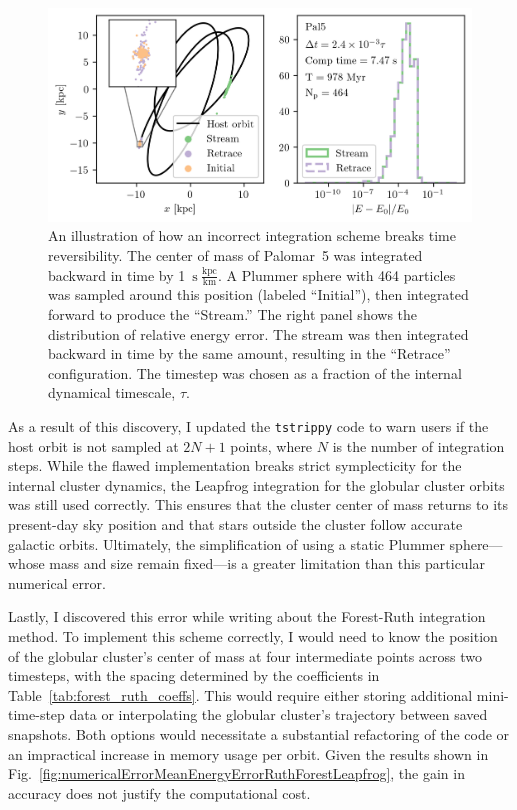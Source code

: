         \begin{figure}
            \centering
            \includegraphics[width=\linewidth]{images/NumericalErrorStreamRetrace_Pal5_Nsteps_32768_stepsPerTau_420.png}
            \caption{An illustration of how an incorrect integration scheme breaks time reversibility. The center of mass of Palomar~5 was integrated backward in time by 1~$\mathrm{s}~\frac{\mathrm{kpc}}{\mathrm{km}}$. A Plummer sphere with 464 particles was sampled around this position (labeled “Initial”), then integrated forward to produce the “Stream.” The right panel shows the distribution of relative energy error. The stream was then integrated backward in time by the same amount, resulting in the “Retrace” configuration. The timestep was chosen as a fraction of the internal dynamical timescale, $\tau$.}
            \label{fig:NumericalErrorStreamRetrace_Pal5_Nsteps_32768_stepsPerTau_420}
        \end{figure}
        As a result of this discovery, I updated the \texttt{tstrippy} code to warn users if the host orbit is not sampled at $2N + 1$ points, where $N$ is the number of integration steps. While the flawed implementation breaks strict symplecticity for the internal cluster dynamics, the Leapfrog integration for the globular cluster orbits was still used correctly. This ensures that the cluster center of mass returns to its present-day sky position and that stars outside the cluster follow accurate galactic orbits. Ultimately, the simplification of using a static Plummer sphere—whose mass and size remain fixed—is a greater limitation than this particular numerical error.

        Lastly, I discovered this error while writing about the Forest-Ruth integration method. To implement this scheme correctly, I would need to know the position of the globular cluster's center of mass at four intermediate points across two timesteps, with the spacing determined by the coefficients in Table~\ref{tab:forest_ruth_coeffs}. This would require either storing additional mini-time-step data or interpolating the globular cluster's trajectory between saved snapshots. Both options would necessitate a substantial refactoring of the code or an impractical increase in memory usage per orbit. Given the results shown in Fig.~\ref{fig:numericalErrorMeanEnergyErrorRuthForestLeapfrog}, the gain in accuracy does not justify the computational cost.

